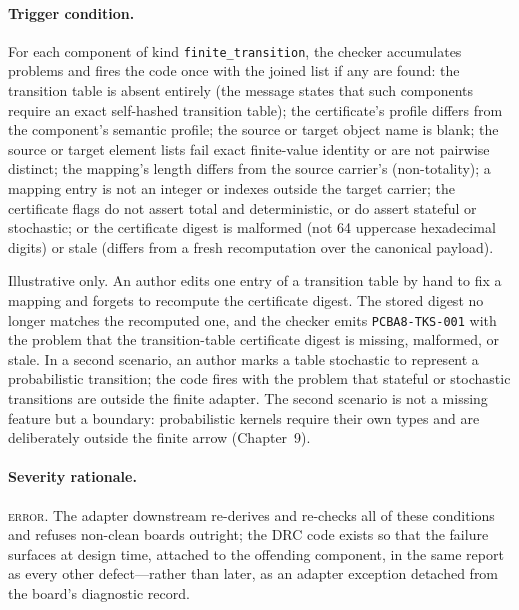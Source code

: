 \paragraph{Trigger condition.} For each component of kind \texttt{finite\_transition}, the checker accumulates problems and fires the code once with the joined list if any are found: the transition table is absent entirely (the message states that such components require an exact self-hashed transition table); the certificate's profile differs from the component's semantic profile; the source or target object name is blank; the source or target element lists fail exact finite-value identity or are not pairwise distinct; the mapping's length differs from the source carrier's (non-totality); a mapping entry is not an integer or indexes outside the target carrier; the certificate flags do not assert total and deterministic, or do assert stateful or stochastic; or the certificate digest is malformed (not 64 uppercase hexadecimal digits) or stale (differs from a fresh recomputation over the canonical payload).

\begin{example}\label{ch07:ex:tks001}
Illustrative only. An author edits one entry of a transition table by hand to fix a mapping and forgets to recompute the certificate digest. The stored digest no longer matches the recomputed one, and the checker emits \texttt{PCBA8-TKS-001} with the problem that the transition-table certificate digest is missing, malformed, or stale. In a second scenario, an author marks a table stochastic to represent a probabilistic transition; the code fires with the problem that stateful or stochastic transitions are outside the finite adapter. The second scenario is not a missing feature but a boundary: probabilistic kernels require their own types and are deliberately outside the finite arrow (Chapter~9).
\end{example}

\paragraph{Severity rationale.} \textsc{error}. The adapter downstream re-derives and re-checks all of these conditions and refuses non-clean boards outright; the DRC code exists so that the failure surfaces at design time, attached to the offending component, in the same report as every other defect---rather than later, as an adapter exception detached from the board's diagnostic record.

